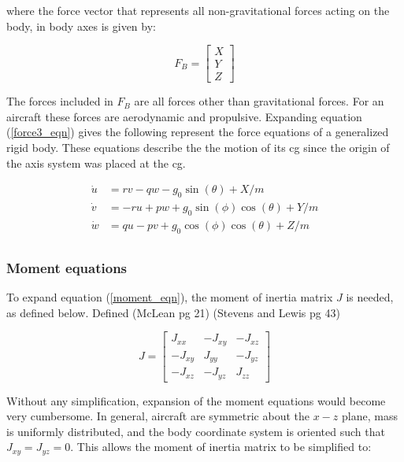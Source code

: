 where the force vector that represents all non-gravitational forces acting on the body, in body axes is given by:

\begin{equation*}
  F_{B}=
  \begin{bmatrix}
    X \\
    Y \\
    Z
  \end{bmatrix}
\end{equation*}

The forces included in $F_{B}$ are all forces other than gravitational forces.
For an aircraft these forces are aerodynamic and propulsive.
Expanding equation (\ref{force3_eqn}) gives the following represent the force equations of a generalized rigid body.
These equations describe the the motion of its cg since the origin of the axis system was placed at the cg.

\begin{equation}
  \label{ssforce_eqn}
  \begin{split}
    \dot{u}&=rv-qw-g_{0}\sin(\theta)+X/m \\
    \dot{v}&=-ru+pw+g_{0}\sin(\phi)\cos(\theta)+Y/m \\
    \dot{w}&=qu-pv+g_{0}\cos(\phi)\cos(\theta)+Z/m \\
  \end{split}
\end{equation}

\subsubsection{Moment equations}

To expand equation (\ref{moment_eqn}), the moment of inertia matrix $J$ is needed, as defined below.
Defined (McLean pg 21) (Stevens and Lewis pg 43)

\begin{equation*}
  J=
  \begin{bmatrix}
    J_{xx} & -J_{xy} & -J_{xz} \\
    -J_{xy} & J_{yy} & -J_{yz} \\
    -J_{xz} & -J_{yz} & J_{zz}
  \end{bmatrix}
\end{equation*}

Without any simplification, expansion of the moment equations would become very cumbersome.
In general, aircraft are symmetric about the $x-z$ plane, mass is uniformly distributed, and the body coordinate system is oriented such that $J_{xy}=J_{yz}=0$.
This allows the moment of inertia matrix to be simplified to:

